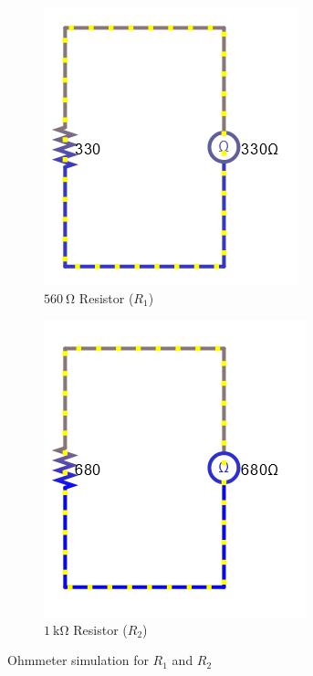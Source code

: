 \documentclass[a4paper]{article}
\begin{document}
\begin{figure}[H]
\begin{subfigure}{0.48\textwidth}
\includegraphics[width=\linewidth]{ohm_330}
\caption{$\SI{560}{\ohm}$ Resistor ($R_1$)}
\end{subfigure}
\begin{subfigure}{0.48\textwidth}
\includegraphics[width=\linewidth]{ohm_680}
\caption{$\SI{1}{\kilo\ohm}$ Resistor ($R_2$)}
\end{subfigure}
\caption{Ohmmeter simulation for $R_1$ and $R_2$}
\label{fig:2}
\end{figure}
\end{document}
